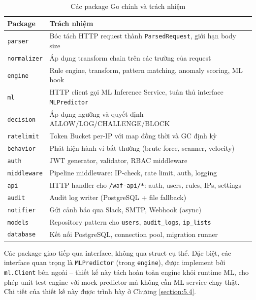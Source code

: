 \documentclass[../DoAn.tex]{subfiles}
\begin{document}
\begin{table}[h!]
\centering
\caption{Các package Go chính và trách nhiệm}
\label{table:packages}
\small
\begin{tabular}{|l|p{8.5cm}|}
\hline
\textbf{Package} & \textbf{Trách nhiệm} \\
\hline
\texttt{parser} & Bóc tách HTTP request thành \texttt{ParsedRequest}, giới hạn body size \\
\hline
\texttt{normalizer} & Áp dụng transform chain trên các trường của request \\
\hline
\texttt{engine} & Rule engine, transform, pattern matching, anomaly scoring, ML hook \\
\hline
\texttt{ml} & HTTP client gọi ML Inference Service, tuân thủ interface \texttt{MLPredictor} \\
\hline
\texttt{decision} & Áp dụng ngưỡng và quyết định ALLOW/LOG/CHALLENGE/BLOCK \\
\hline
\texttt{ratelimit} & Token Bucket per-IP với map đồng thời và GC định kỳ \\
\hline
\texttt{behavior} & Phát hiện hành vi bất thường (brute force, scanner, velocity) \\
\hline
\texttt{auth} & JWT generator, validator, RBAC middleware \\
\hline
\texttt{middleware} & Pipeline middleware: IP-check, rate limit, auth, logging \\
\hline
\texttt{api} & HTTP handler cho \texttt{/waf-api/*}: auth, users, rules, IPs, settings \\
\hline
\texttt{audit} & Audit log writer (PostgreSQL + file fallback) \\
\hline
\texttt{notifier} & Gửi cảnh báo qua Slack, SMTP, Webhook (async) \\
\hline
\texttt{models} & Repository pattern cho \texttt{users}, \texttt{audit\_logs}, \texttt{ip\_lists} \\
\hline
\texttt{database} & Kết nối PostgreSQL, connection pool, migration runner \\
\hline
\end{tabular}
\end{table}

Các package giao tiếp qua interface, không qua struct cụ thể. Đặc biệt, các
interface quan trọng là \texttt{MLPredictor} (trong \texttt{engine}), được
implement bởi \texttt{ml.Client} bên ngoài -- thiết kế này tách hoàn toàn
engine khỏi runtime ML, cho phép unit test engine với mock predictor mà
không cần ML service chạy thật. Chi tiết của thiết kế này được trình bày
ở Chương \ref{section:5.4}.
\end{document}
